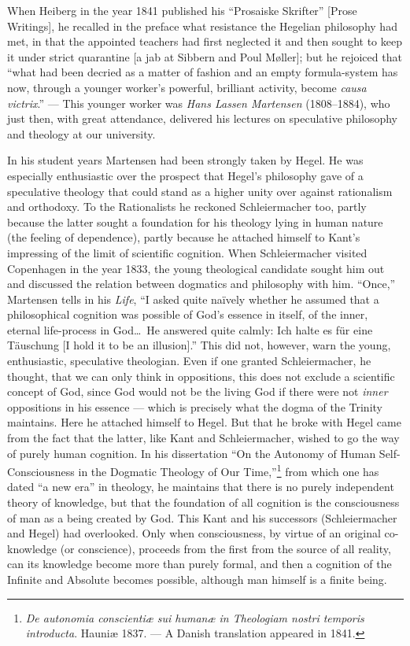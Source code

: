 \documentclass[12pt,a4paper]{book}
\newcommand{\opage}[1]{\marginnote{\footnotesize\textit{[#1]}}}
\begin{document}
When Heiberg in the year 1841 published his ``Prosaiske Skrifter'' [Prose Writings], he recalled
in the preface what resistance the Hegelian philosophy had met, in that the appointed teachers
had first \opage{137}neglected it and then sought to keep it under strict quarantine [a jab at Sibbern and
Poul Møller]; but he rejoiced that ``what had been decried as a matter of fashion and an empty
formula-system has now, through a younger worker's powerful, brilliant activity, become \emph{causa
victrix}.'' --- This younger worker was \emph{Hans Lassen Martensen} (1808--1884), who just then, with
great attendance, delivered his lectures on speculative philosophy and theology at our university.

In his student years Martensen had been strongly taken by Hegel. He was especially enthusiastic
over the prospect that Hegel's philosophy gave of a speculative theology that could stand as a
higher unity over against rationalism and orthodoxy. To the Rationalists he reckoned Schleiermacher
too, partly because the latter sought a foundation for his theology lying in human nature (the
feeling of dependence), partly because he attached himself to Kant's impressing of the limit of
scientific cognition. When Schleiermacher visited Copenhagen in the year 1833, the young
theological candidate sought him out and discussed the relation between dogmatics and philosophy
with him. ``Once,'' Martensen tells in his \emph{Life}, ``I asked quite naïvely whether he assumed
that a philosophical cognition was possible of God's essence in itself, of the inner, eternal
life-process in God\ldots\ He answered quite calmly: Ich halte es für eine Täuschung [I hold it to
be an illusion].'' This did not, however, warn the young, enthusiastic, speculative theologian.
Even if one granted Schleiermacher, he thought, that we can only think in oppositions, this does
not exclude a scientific concept of God, since God would not be the living God if there were not
\emph{inner} oppositions in his essence --- which is precisely what the dogma of the Trinity
maintains. Here he attached himself to Hegel. But that he broke with Hegel came from the fact that
the latter, like Kant and Schleiermacher, wished to go the way of purely human cognition. In his
dissertation ``On the Autonomy of Human Self-Consciousness in the Dogmatic Theology of Our
Time,''\footnote{\emph{De autonomia conscientiæ sui humanæ in Theologiam nostri temporis
introducta}. Hauniæ 1837. --- A Danish translation appeared in 1841.} from which one has dated
``a new era'' in theology, he maintains that there is no purely independent \opage{138}theory of knowledge,
but that the foundation of all cognition is the consciousness of man as a being created by God.
This Kant and his successors (Schleiermacher and Hegel) had overlooked. Only when consciousness,
by virtue of an original co-knowledge (or conscience), proceeds from the first from the source of
all reality, can its knowledge become more than purely formal, and then a cognition of the
Infinite and Absolute becomes possible, although man himself is a finite being.
\end{document}
